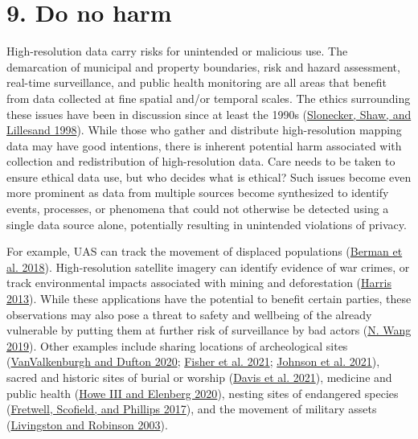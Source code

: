 \documentclass[
  12pt,
]{article}
\begin{document}
\hypertarget{do-no-harm}{%
\section{9. Do no harm}\label{do-no-harm}}

High-resolution data carry risks for unintended or malicious use. The
demarcation of municipal and property boundaries, risk and hazard
assessment, real-time surveillance, and public health monitoring are all
areas that benefit from data collected at fine spatial and/or temporal
scales. The ethics surrounding these issues have been in discussion
since at least the 1990s
(\protect\hyperlink{ref-slonecker1998}{Slonecker, Shaw, and Lillesand
1998}). While those who gather and distribute high-resolution mapping
data may have good intentions, there is inherent potential harm
associated with collection and redistribution of high-resolution data.
Care needs to be taken to ensure ethical data use, but who decides what
is ethical? Such issues become even more prominent as data from multiple
sources become synthesized to identify events, processes, or phenomena
that could not otherwise be detected using a single data source alone,
potentially resulting in unintended violations of privacy.

For example, UAS can track the movement of displaced populations
(\protect\hyperlink{ref-berman2018ethical}{Berman et al. 2018}).
High-resolution satellite imagery can identify evidence of war crimes,
or track environmental impacts associated with mining and deforestation
(\protect\hyperlink{ref-harris2013reflections}{Harris 2013}). While
these applications have the potential to benefit certain parties, these
observations may also pose a threat to safety and wellbeing of the
already vulnerable by putting them at further risk of surveillance by
bad actors (\protect\hyperlink{ref-wang2019success}{N. Wang 2019}).
Other examples include sharing locations of archeological sites
(\protect\hyperlink{ref-vanvalkenburgh2020}{VanValkenburgh and Dufton
2020}; \protect\hyperlink{ref-fisher2021}{Fisher et al. 2021};
\protect\hyperlink{ref-johnson2021}{Johnson et al. 2021}), sacred and
historic sites of burial or worship
(\protect\hyperlink{ref-davis2021}{Davis et al. 2021}), medicine and
public health (\protect\hyperlink{ref-howe2020}{Howe III and Elenberg
2020}), nesting sites of endangered species
(\protect\hyperlink{ref-fretwell2017}{Fretwell, Scofield, and Phillips
2017}), and the movement of military assets
(\protect\hyperlink{ref-livingston2003}{Livingston and Robinson 2003}).
\end{document}
